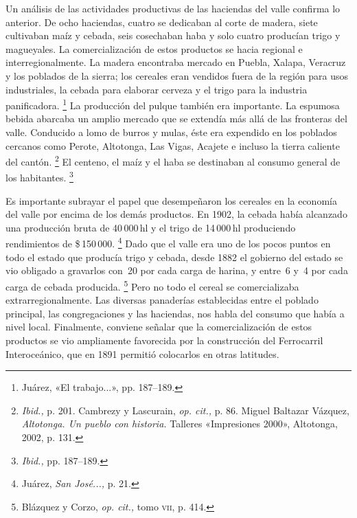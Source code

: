 \documentclass[14pt,twoside,final]{extbook} %
\let\oldfootnote\footnote
\renewcommand\footnote[1]{%
\oldfootnote{\hspace{1mm}#1}}
\begin{document}
Un análisis de las actividades productivas de las haciendas del valle confirma lo anterior. De ocho haciendas, cuatro se dedicaban al corte de madera, siete cultivaban maíz y cebada, seis cosechaban haba y solo cuatro producían trigo y magueyales. La comercialización de estos productos se hacia regional e interregionalmente. La madera encontraba mercado en Puebla, Xalapa, Veracruz y los poblados de la sierra; los cereales eran vendidos fuera de la región para usos industriales, la cebada para elaborar cerveza y el trigo para la industria panificadora.\footnote{Juárez, «El trabajo...», pp. 187--189.} La producción del pulque también era importante. La espumosa bebida abarcaba un amplio mercado que se extendía más allá de las fronteras del valle. Conducido a lomo de burros y mulas, éste era expendido en los poblados cercanos como Perote, Altotonga, Las Vigas, Acajete e incluso la tierra caliente del cantón.\footnote{\emph{Ibid.,} p. 201. Cambrezy y Lascurain, \emph{op. cit.,} p. 86. Miguel Baltazar Vázquez, \emph{Altotonga. Un pueblo con historia.} Talleres «Impresiones 2000», Altotonga, 2002, p. 131.} El centeno, el maíz y el haba se destinaban al consumo general de los habitantes.\footnote{\emph{Ibid.,} pp. 187--189.}

Es importante subrayar el papel que desempeñaron los cereales en la economía del valle por encima de los demás productos. En 1902, la cebada había alcanzado una producción bruta de 40\,000\,hl y el trigo de 14\,000\,hl produciendo rendimientos de \$\,150\,000.\footnote{Juárez, \emph{San José...,} p. 21.} Dado que el valle era uno de los pocos puntos en todo el estado que producía trigo y cebada, desde 1882 el gobierno del estado se vio obligado a gravarlos con \textcent{}\,20 por cada carga de harina, y entre \textcent{}\,6 y \textcent{}\,4 por cada carga de cebada producida.\footnote{Blázquez y Corzo, \emph{op. cit.,} tomo \textsc{vii}, p. 414.} Pero no todo el cereal se comercializaba extrarregionalmente. Las diversas panaderías establecidas entre el poblado principal, las congregaciones y las haciendas, nos habla del consumo que había a nivel local. Finalmente, conviene señalar que la comercialización de estos productos se vio ampliamente favorecida por la construcción del Ferrocarril Interoceánico, que en 1891 permitió colocarlos en otras latitudes.
\end{document}
